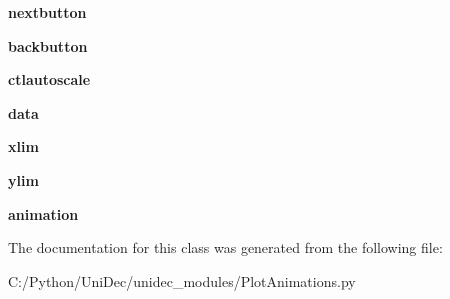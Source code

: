 \begin{DoxyCompactItemize}
\item 
\hypertarget{class_uni_dec_1_1unidec__modules_1_1_plot_animations_1_1_animation_window_ab9746238cd6ae8aa4e9932c8f0df2279}{}{\bfseries nextbutton}\label{class_uni_dec_1_1unidec__modules_1_1_plot_animations_1_1_animation_window_ab9746238cd6ae8aa4e9932c8f0df2279}

\item 
\hypertarget{class_uni_dec_1_1unidec__modules_1_1_plot_animations_1_1_animation_window_adab1ddd1d2013941bc036f3ba44447e0}{}{\bfseries backbutton}\label{class_uni_dec_1_1unidec__modules_1_1_plot_animations_1_1_animation_window_adab1ddd1d2013941bc036f3ba44447e0}

\item 
\hypertarget{class_uni_dec_1_1unidec__modules_1_1_plot_animations_1_1_animation_window_ae15c19813ce873a72202225b05ee1f76}{}{\bfseries ctlautoscale}\label{class_uni_dec_1_1unidec__modules_1_1_plot_animations_1_1_animation_window_ae15c19813ce873a72202225b05ee1f76}

\item 
\hypertarget{class_uni_dec_1_1unidec__modules_1_1_plot_animations_1_1_animation_window_aeff70e3755fa7febdedaa67e440db0fd}{}{\bfseries data}\label{class_uni_dec_1_1unidec__modules_1_1_plot_animations_1_1_animation_window_aeff70e3755fa7febdedaa67e440db0fd}

\item 
\hypertarget{class_uni_dec_1_1unidec__modules_1_1_plot_animations_1_1_animation_window_a00f71f31be2b2fb036782745a454959c}{}{\bfseries xlim}\label{class_uni_dec_1_1unidec__modules_1_1_plot_animations_1_1_animation_window_a00f71f31be2b2fb036782745a454959c}

\item 
\hypertarget{class_uni_dec_1_1unidec__modules_1_1_plot_animations_1_1_animation_window_af8d2656704ea77ce26d4e435c06a3422}{}{\bfseries ylim}\label{class_uni_dec_1_1unidec__modules_1_1_plot_animations_1_1_animation_window_af8d2656704ea77ce26d4e435c06a3422}

\item 
\hypertarget{class_uni_dec_1_1unidec__modules_1_1_plot_animations_1_1_animation_window_a8945c7470be349dc9e4f7349f76fc4ed}{}{\bfseries animation}\label{class_uni_dec_1_1unidec__modules_1_1_plot_animations_1_1_animation_window_a8945c7470be349dc9e4f7349f76fc4ed}

\end{DoxyCompactItemize}


The documentation for this class was generated from the following file\+:\begin{DoxyCompactItemize}
\item 
C\+:/\+Python/\+Uni\+Dec/unidec\+\_\+modules/Plot\+Animations.\+py\end{DoxyCompactItemize}
